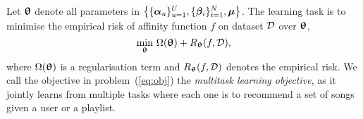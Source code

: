 


Let ${\bm{\uptheta}}$ denote all parameters in $\left\{ \{{\bm{\alpha}}_u\}_{u=1}^U, \{{\bm{\beta}}_i\}_{i=1}^N, \bm{\mu} \right\}$.
The learning task is to minimise the empirical risk of affinity function $f$ on dataset $\mathcal{D}$ over ${\bm{\uptheta}}$,
\ie %
\begin{equation}
\label{eq:obj}
\min_{\bm{\uptheta}} \, \Omega({\bm{\uptheta}}) + R_{\bm{\uptheta}}(f, \mathcal{D}),
\end{equation}
where $\Omega({\bm{\uptheta}})$ is a regularisation term and $R_{\bm{\uptheta}}(f, \mathcal{D})$ denotes the empirical risk.
We call the objective in problem~(\ref{eq:obj}) the {\it multitask learning objective},
as it jointly learns from multiple tasks where each one is to recommend a set of songs given a user or a playlist.


